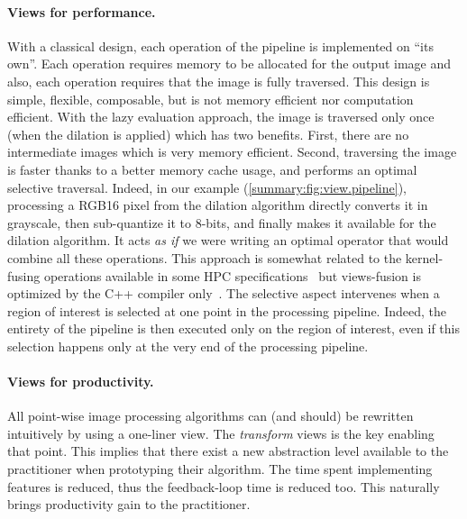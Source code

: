 \paragraph{Views for performance.} With a classical design, each operation of the pipeline is implemented on ``its
own''. Each operation requires memory to be allocated for the output image and also, each operation requires that the
image is fully traversed. This design is simple, flexible, composable, but is not memory efficient nor computation
efficient. With the lazy evaluation approach, the image is traversed only once (when the dilation is applied) which has
two benefits. First, there are no intermediate images which is very memory efficient. Second, traversing the image is
faster thanks to a better memory cache usage, and performs an optimal selective traversal. Indeed, in our example
(\cref{summary:fig:view.pipeline}), processing a RGB16 pixel from the dilation algorithm directly converts it in
grayscale, then sub-quantize it to 8-bits, and finally makes it available for the dilation algorithm. It acts \emph{as
  if} we were writing an optimal operator that would combine all these operations. This approach is somewhat related to
the kernel-fusing operations available in some HPC specifications~\parencite{openvx.2019} but views-fusion is optimized
by the C++ compiler only~\parencite{brown.2018.ranges}. The selective aspect intervenes when a region of interest is
selected at one point in the processing pipeline. Indeed, the entirety of the pipeline is then executed only on the
region of interest, even if this selection happens only at the very end of the processing pipeline.

\paragraph{Views for productivity.} All point-wise image processing algorithms can (and should) be rewritten intuitively
by using a one-liner view. The \emph{transform} views is the key enabling that point. This implies that there exist a
new abstraction level available to the practitioner when prototyping their algorithm. The time spent implementing
features is reduced, thus the feedback-loop time is reduced too. This naturally brings productivity gain to the
practitioner.
